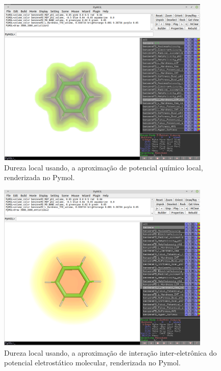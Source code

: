 \documentclass[a4paper,11pt]{refart}
\begin{document}
\hspace*{-\leftmarginwidth}
\begin{minipage}{\fullwidth}
	\begin{figure}[H]
		\begin{center}
			\includegraphics[width=4in]{images/tut2_img9}
			\caption{Dureza local usando, a aproximação de potencial químico local, renderizada no Pymol.}
			\label{fig_tut2_8}
		\end{center}
	\end{figure}
\end{minipage}

\hspace*{-\leftmarginwidth}
\begin{minipage}{\fullwidth}
	\begin{figure}[H]
		\begin{center}
			\includegraphics[width=4in]{images/tut2_img10}
			\caption{Dureza local usando, a aproximação de interação inter-eletrônica do potencial eletrostático molecular, renderizada no Pymol.}
			\label{fig_tut2_9}
		\end{center}
	\end{figure}
\end{minipage}
\end{document}
